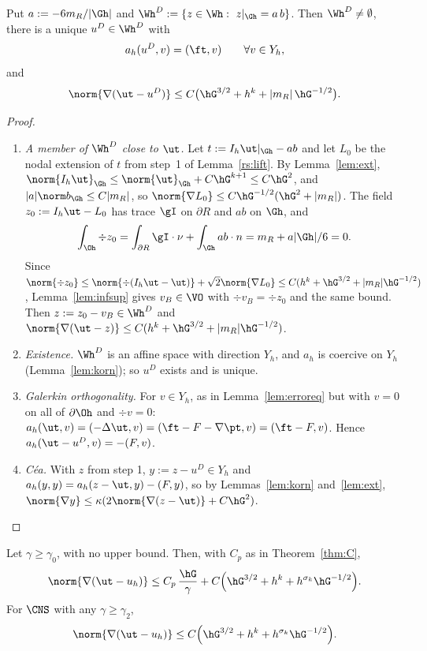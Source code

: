 \begin{lemma}\label{rs:dir}
Put $a:=-6m_R/|\Gh|$ and $\Wh^D:=\{z\in\Wh:\ z|_{\Gh}=a\,b\}$. Then $\Wh^D\neq\emptyset$, there is a unique $u^D\in\Wh^D$ with
\[
a_h(u^D,v)=(\ft,v)\qquad\forall v\in Y_h,
\]
and
\[
\norm{\nabla(\ut-u^D)}\le C\bigl(\hG^{3/2}+h^k+|m_R|\,\hG^{-1/2}\bigr).
\]
\end{lemma}

\begin{proof}
\begin{enumerate}
\item \emph{A member of $\Wh^D$ close to $\ut$.} Let $t:=I_h\ut|_{\Gh}-ab$ and let $L_0$ be the nodal extension of $t$ from step~1 of Lemma~\ref{rs:lift}. By Lemma~\ref{lem:ext}, $\norm{I_h\ut}_{\Gh}\le\norm{\ut}_{\Gh}+C\hG^{k+1}\le C\hG^2$, and $|a|\norm b_{\Gh}\le C|m_R|$, so $\norm{\nabla L_0}\le C\hG^{-1/2}(\hG^2+|m_R|)$. The field $z_0:=I_h\ut-L_0$ has trace $\gI$ on $\partial R$ and $ab$ on $\Gh$, and
\[
\int_{\Oh}\div z_0=\int_{\partial R}\gI\cdot\nu+\int_{\Gh}ab\cdot n=m_R+a|\Gh|/6=0 .
\]
Since $\norm{\div z_0}\le\norm{\div(I_h\ut-\ut)}+\sqrt2\norm{\nabla L_0}\le C(h^k+\hG^{3/2}+|m_R|\hG^{-1/2})$, Lemma~\ref{lem:infsup} gives $v_B\in\VO$ with $\div v_B=\div z_0$ and the same bound. Then $z:=z_0-v_B\in\Wh^D$ and $\norm{\nabla(\ut-z)}\le C(h^k+\hG^{3/2}+|m_R|\hG^{-1/2})$.
\item \emph{Existence.} $\Wh^D$ is an affine space with direction $Y_h$, and $a_h$ is coercive on $Y_h$ (Lemma~\ref{lem:korn}); so $u^D$ exists and is unique.
\item \emph{Galerkin orthogonality.} For $v\in Y_h$, as in Lemma~\ref{lem:erroreq} but with $v=0$ on all of $\partial\Oh$ and $\div v=0$: $a_h(\ut,v)=(-\Delta\ut,v)=(\ft-F-\nabla\pt,v)=(\ft-F,v)$. Hence $a_h(\ut-u^D,v)=-(F,v)$.
\item \emph{C\'ea.} With $z$ from step 1, $y:=z-u^D\in Y_h$ and $a_h(y,y)=a_h(z-\ut,y)-(F,y)$, so by Lemmas~\ref{lem:korn} and~\ref{lem:ext}, $\norm{\nabla y}\le\kappa(2\norm{\nabla(z-\ut)}+C\hG^2)$.\qedhere
\end{enumerate}
\end{proof}

\begin{theorem}\label{rs:unif}
Let $\gamma\ge\gamma_0$, with no upper bound. Then, with $C_p$ as in Theorem~\ref{thm:C},
\[
\norm{\nabla(\ut-u_h)}\le C_p\,\frac{\hG}{\gamma}+C\Bigl(\hG^{3/2}+h^k+h^{\sigma_k}\hG^{-1/2}\Bigr).
\]
For $\CNS$ with any $\gamma\ge\gamma_2$,
\[
\norm{\nabla(\ut-u_h)}\le C\Bigl(\hG^{3/2}+h^k+h^{\sigma_k}\hG^{-1/2}\Bigr).
\]
\end{theorem}

